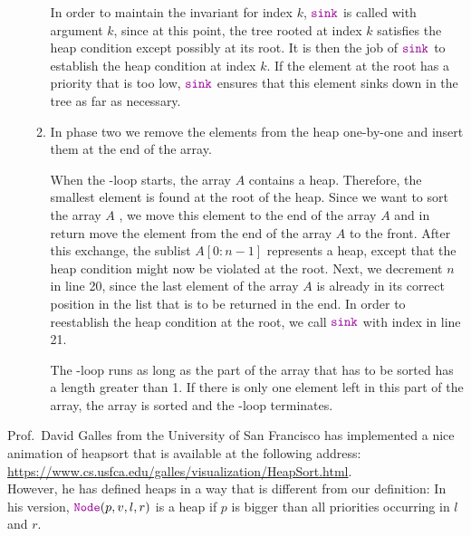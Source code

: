 \begin{enumerate}
\begin{enumerate}
            In order to maintain the invariant for index ${k}$, $\mytt{sink}$ is called with
            argument ${k}$,  since at this point, the tree rooted at index ${k}$ satisfies
            the heap condition except possibly at its root.  It is then the job of $\mytt{sink}$ to
            establish the heap condition at index ${k}$.  If the element at the root has a
            priority that is too low, $\mytt{sink}$ ensures that this element sinks down in the tree
            as far as necessary.
      \item In phase two we remove the elements from the heap one-by-one and insert them at the end of
            the array.

            When the -loop starts, the array ${A}$ contains a heap.  Therefore,
            the smallest element is found at the root of the heap.  Since we want to sort the
            array ${A}$ , we move this element to the end of the array ${A}$ and in
            return move the element from the end of the array ${A}$ to the front.
            After this exchange, the sublist $A[0:n-1]$ represents a heap, except that the
            heap condition might now be violated at the root.  Next, we decrement ${n}$ in line 20, since the
            last element of the array ${A}$ is already in its correct position in the list that is to be
            returned in the end.  In order to reestablish the heap condition at the root, we call $\mytt{sink}$ with index
             in line 21.

            The -loop runs as long as the part of the array that has to be sorted has
            a length greater than 1.  If there is only one element left in this part of the array, the array is
            sorted and the -loop terminates.
      \end{enumerate}
\end{enumerate}
Prof.~David Galles from the University of San Francisco has implemented a nice animation of heapsort that is
available at the following address:
\\[0.2cm]
\hspace*{1.3cm}
\href{https://www.cs.usfca.edu/~galles/visualization/HeapSort.html}{https://www.cs.usfca.edu/galles/visualization/HeapSort.html}.
\\[0.2cm] 
However, he has defined heaps in a way that is different from our definition:  In his version,
$\mytt{Node}(p, v, l, r)$ is a heap if $p$ is bigger than all priorities occurring in $l$ and $r$.

